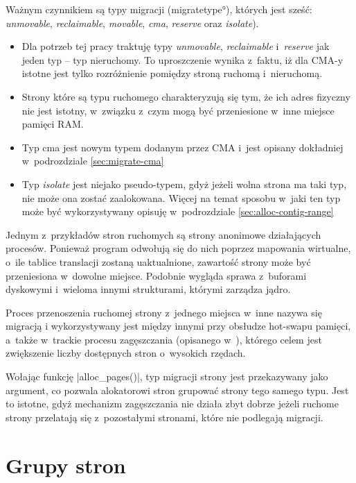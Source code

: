 Ważnym czynnikiem są typy migracji (\ang{migratetype}), których jest
sześć: {\it unmovable}, {\it reclaimable}, {\it movable}, {\it cma},
{\it reserve} oraz {\it isolate}).

\begin{itemize}
\item Dla potrzeb tej pracy traktuję typy {\it unmovable}, {\it
  reclaimable} i~{\it reserve} jak jeden typ -- typ nieruchomy.  To
  uproszczenie wynika z~faktu, iż dla CMA-y istotne jest tylko
  rozróżnienie pomiędzy stroną ruchomą i~nieruchomą.
\item Strony które są typu ruchomego charakteryzują się tym, że ich
  adres fizyczny nie jest istotny, w~związku z~czym mogą być
  przeniesione w~inne miejsce pamięci RAM.
\item Typ cma jest nowym typem dodanym przez CMA i~jest opisany
  dokładniej w~podrozdziale \ref{sec:migrate-cma}
\item Typ {\it isolate} jest niejako pseudo-typem, gdyż jeżeli wolna
  strona ma taki typ, nie może ona zostać zaalokowana.  Więcej na
  temat sposobu w~jaki ten typ może być wykorzystywany opisuję
  w~podrozdziale \ref{sec:alloc-contig-range}
\end{itemize}

Jednym z~przykładów stron ruchomych są strony anonimowe działających
procesów.  Ponieważ program odwołują się do nich poprzez mapowania
wirtualne, o~ile tablice translacji zostaną uaktualnione, zawartość
strony może być przeniesiona w~dowolne miejsce.  Podobnie wygląda
sprawa z~buforami dyskowymi i~wieloma innymi strukturami, którymi
zarządza jądro.

Proces przenoszenia ruchomej strony z~jednego miejsca w~inne nazywa
się migracją i wykorzystywany jest między innymi przy obsłudze
hot-swapu pamięci, a~także w~trackie procesu zagęszczania (opisanego
w~\cite{bib:compaction}), którego celem jest zwiększenie liczby
dostępnych stron o~wysokich rzędach.

Wołając funkcję \code|alloc_pages()|, typ migracji strony jest
przekazywany jako argument, co pozwala alokatorowi stron grupować
strony tego samego typu.  Jest to istotne, gdyż mechanizm zagęszczania
nie działa zbyt dobrze jeżeli ruchome strony przelatają się
z~pozostałymi stronami, które nie podlegają migracji.

\section{Grupy stron}

